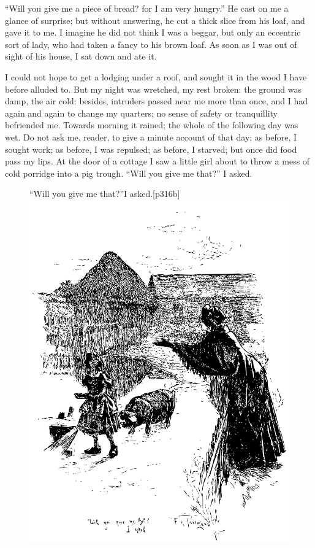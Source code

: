 \enquote{Will you give me a piece of bread? for I am very hungry.} He
cast on me a glance of surprise; but without answering, he cut a thick
slice from his loaf, and gave it to me. I imagine he did not think I
was a beggar, but only an eccentric sort of lady, who had taken a fancy
to his brown loaf. As soon as I was out of sight of his house, I sat
down and ate it.

I could not hope to get a lodging under a roof, and sought it in the
wood I have before alluded to. But my night was wretched, my rest
broken: the ground was damp, the air cold: besides, intruders passed
near me more than once, and I had again and again to change my quarters;
no sense of safety or tranquillity befriended me. Towards morning it
rained; the whole of the following day was wet. Do not ask me, reader,
to give a minute account of that day; as before, I sought work; as
before, I was repulsed; as before, I starved; but once did food pass my
lips. At the door of a cottage I saw a little girl about to throw a
mess of cold porridge into a pig trough. \enquote{Will you give me
that?} I asked.

\begin{figure}
	\begin{sidecaption}{\enquote{Will you give me that?}\linebreak I asked.}[p316b]
		\centering
		\includegraphics[width=\linewidth]{images/p316b.pdf}
	\end{sidecaption}
\end{figure}

